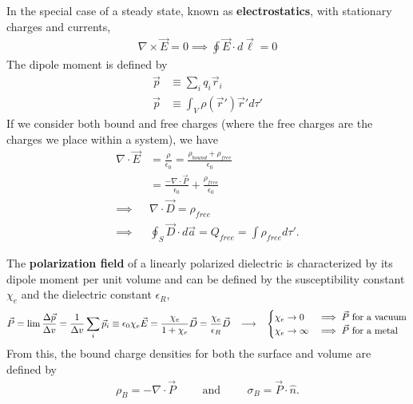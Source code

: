 \begin{multicols}{2}
In the special case of a steady state, known as \textbf{electrostatics}, with stationary charges and currents, \begin{align}
 \nabla \times \vec{E} = 0 \implies \oint \vec{E} \cdot d\vec{\ell} = 0 
\end{align}	
The dipole moment is defined by
\begin{align}
	\vec{p} &\equiv \sum_{i}^{}q_i \vec{r}_i \\ \vec{p} &\equiv \int_V \rho(\vec{r}')\vec{r}' d\tau'
\end{align}
If we consider both bound and free charges (where the free charges are the charges we place within a system), we have
\begin{align}
	\nabla \cdot \vec{E} &= \frac{\rho}{\epsilon_0} = \frac{\rho_{bound}+\rho_{free}}{\epsilon_0} \\ &= \frac{-\nabla \cdot \vec{P}}{\epsilon_0}+\frac{\rho_{free}}{\epsilon_0} \\ \implies &\nabla \cdot \vec{D} = \rho_{free} \\ \implies &\oint_S \vec{D} \cdot d\vec{a} = Q_{free} = \int \rho_{free} d\tau'.
\end{align}
\end{multicols}
The \textbf{polarization field} of a linearly polarized dielectric is characterized by its dipole moment per unit volume and can be defined by the susceptibility constant $\chi_e$ and the dielectric constant $\epsilon_R$,
\begin{align}
	\vec{P} =\lim \frac{\Delta \vec{p}}{\Delta v} = \frac{1}{\Delta v}\sum_{i}\vec{p}_i\equiv \epsilon_0 \chi_e \vec{E}  = \frac{\chi_e}{1+\chi_e}\vec{D} = \frac{\chi_e}{\epsilon_R}\vec{D}\hspace{0.3cm}\longrightarrow \hspace{0.3cm}\begin{cases}
		\chi_e \rightarrow 0 & \implies \vec{P} \textrm{ for a vacuum} \\ \chi_e \rightarrow \infty & \implies \vec{P} \textrm{ for a metal}
		\end{cases}
\end{align}
From this, the bound charge densities for both the surface and volume are defined by
\begin{align}
	\rho_B = -\nabla \cdot \vec{P} \hspace{1cm}\textrm{and}\hspace{1cm}	\sigma_B = \vec{P} \cdot \hat{n}.
\end{align} 
